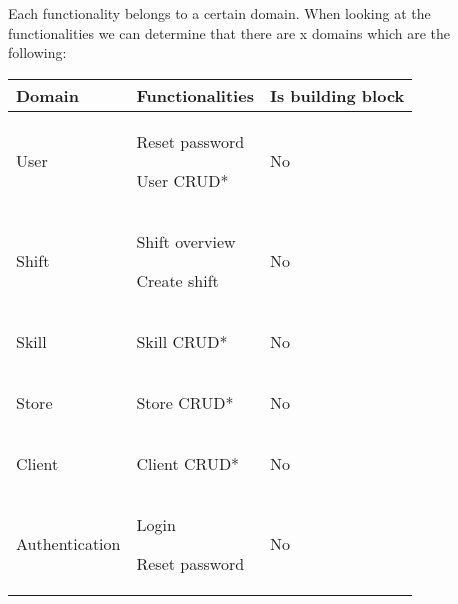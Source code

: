 Each functionality belongs to a certain domain. When looking at the functionalities we can determine that there are x domains which are the following:

\begin{tabularx}{\linewidth}{|>{}X|>{}X|>{}X|}
    \hline

    Domain
     &
    Functionalities
    &
    Is building block
    \\ \hline

    User
     &
    \begin{compactitem}
        \item Reset password
        \item User CRUD*
    \end{compactitem}  
    &
    No
    \\ \hline

    Shift
     &
    \begin{compactitem}
        \item Shift overview
        \item Create shift
    \end{compactitem}
    &
    No
    \\ \hline

    Skill
     &
    \begin{compactitem}
        \item Skill CRUD*
    \end{compactitem}
    &
    No
    \\ \hline

    Store
     &
    \begin{compactitem}
        \item Store CRUD*
    \end{compactitem}
    &
    No
    \\ \hline

    Client
     &
    \begin{compactitem}
        \item Client CRUD*
    \end{compactitem}
    &
    No
    \\ \hline

    Authentication
     &
    \begin{compactitem}
        \item Login
        \item Reset password
    \end{compactitem}
    &
    No
    \\ \hline


\end{tabularx}
